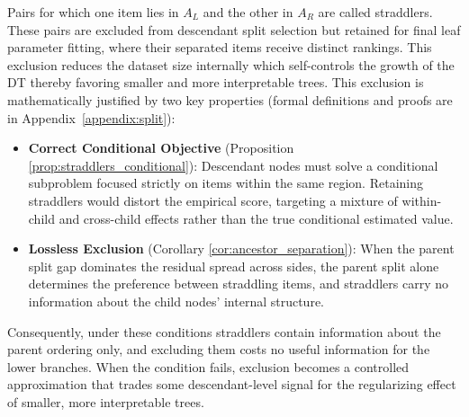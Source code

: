 \documentclass{article}
\begin{document}
Pairs for which one item lies in $A_L$ and the other in $A_R$ are called straddlers. These pairs are excluded from descendant split selection but retained for final leaf parameter fitting, where their separated items receive distinct rankings. This exclusion reduces the dataset size internally which self-controls the growth of the DT thereby favoring smaller and more interpretable trees. 
This exclusion is mathematically justified by two key properties (formal definitions and proofs are in Appendix~\ref{appendix:split}):
\begin{itemize}
\item \textbf{Correct Conditional Objective} (Proposition \ref{prop:straddlers_conditional}): Descendant nodes must solve a conditional subproblem focused strictly on items within the same region. Retaining straddlers would distort the empirical score, targeting a mixture of within-child and cross-child effects rather than the true conditional estimated value.
\item \textbf{Lossless Exclusion} (Corollary \ref{cor:ancestor_separation}): When the parent split gap dominates the residual spread across sides, the parent split alone determines the preference between straddling items, and straddlers carry no information about the child nodes' internal structure.
\end{itemize}
Consequently, under these conditions straddlers contain information about the parent ordering only, and excluding them costs no useful information for the lower branches. When the condition fails, exclusion becomes a controlled approximation that trades some descendant-level signal for the regularizing effect of smaller, more interpretable trees.

\end{document}
